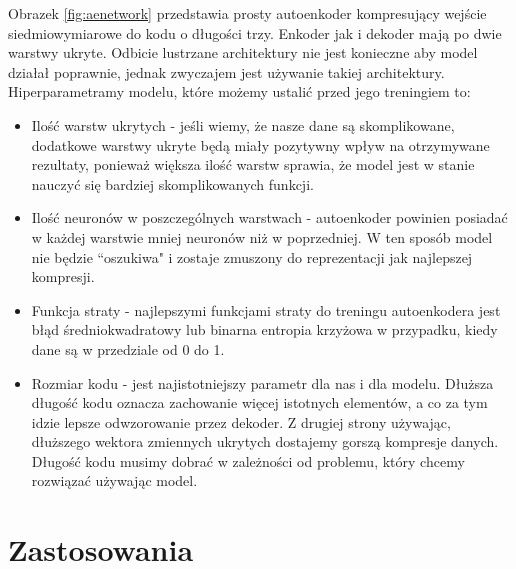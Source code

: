 \documentclass[a4paper,12pt]{book} %
\begin{document}
Obrazek \ref{fig:aenetwork} przedstawia prosty autoenkoder kompresujący wejście siedmiowymiarowe do kodu o długości trzy. Enkoder jak i dekoder mają po dwie warstwy ukryte. Odbicie lustrzane architektury nie jest konieczne aby model działał poprawnie, jednak zwyczajem jest używanie takiej architektury.\\
Hiperparametramy modelu, które możemy ustalić przed jego treningiem to:
\begin{itemize}
	\item Ilość warstw ukrytych - jeśli wiemy, że nasze dane są skomplikowane, dodatkowe warstwy ukryte będą miały pozytywny wpływ na otrzymywane rezultaty, ponieważ większa ilość warstw sprawia, że model jest w stanie nauczyć się bardziej skomplikowanych funkcji.\cite{telgarsky2016benefits, eldan2016power}
	\item Ilość neuronów w poszczególnych warstwach - autoenkoder powinien posiadać w każdej warstwie mniej neuronów niż w poprzedniej. W ten sposób model nie będzie ``oszukiwa" i zostaje zmuszony do reprezentacji jak najlepszej kompresji.
	\item Funkcja straty - najlepszymi funkcjami straty do treningu autoenkodera jest błąd średniokwadratowy lub binarna entropia krzyżowa w przypadku, kiedy dane są w przedziale od 0 do 1.
	\item Rozmiar kodu - jest najistotniejszy parametr dla nas i dla modelu. Dłuższa długość kodu oznacza zachowanie więcej istotnych elementów, a co za tym idzie lepsze odwzorowanie przez dekoder. Z drugiej strony używając, dłuższego wektora zmiennych ukrytych dostajemy gorszą kompresje danych. Długość kodu musimy dobrać w zależności od problemu, który chcemy rozwiązać używając model.
\end{itemize}
\section{Zastosowania}
\end{document}
